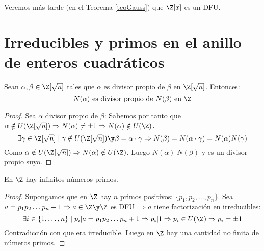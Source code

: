 Veremos más tarde $($en el Teorema \ref{teoGauss}$)$ que $\Z[x]$ es un DFU.

\newpage
\section{Irreducibles y primos en el anillo de enteros cuadráticos}

\begin{lema}
    Sean $\alpha, \beta \in \Z[\sqrt{n}]$ tales que $\alpha$ es divisor propio de $\beta$ en $\Z[\sqrt{n}]$. Entonces:
    $$N(\alpha) \mbox{ es divisor propio de } N(\beta) \mbox{ en } \Z$$
\begin{proof}
    Sea $\alpha$ divisor propio de $\beta$:\newline
    Sabemos por tanto que $\alpha \notin U(\Z[\sqrt{n}]) \Rightarrow N(\alpha) \neq \pm 1 \Rightarrow N(\alpha) \notin U(\Z)$.
    \newline
    $$\exists \gamma \in \Z[\sqrt{n}] \mid \gamma \notin U(\Z[\sqrt{n}]) \y \beta = \alpha \cdot \gamma \Rightarrow
        N(\beta) = N(\alpha \cdot \gamma) = N(\alpha)N(\gamma)$$
    Como $\alpha \notin U(\Z[\sqrt{n}]) \Rightarrow N(\alpha) \notin U(\Z)$.\newline
    Luego $N(\alpha)|N(\beta)$ y es un divisor propio suyo.
\end{proof}
\end{lema}


\begin{teo}
    En $\Z$ hay infinitos números primos.
\begin{proof}
    Supongamos que en $\Z$ hay $n$ primos positivos: $\{p_1, p_2, \ldots, p_n\}$.\newline
    Sea $a=p_1p_2\ldots p_n +1 \Rightarrow a \in \Z \y \Z$ es DFU $\Rightarrow a$ tiene factorización en irreducibles:
    $$\exists i \in \{1, \ldots, n\} \mid p_i|a=p_1p_2\ldots p_n+1 \Rightarrow p_i|1 \Rightarrow p_i \in U(\Z) \Rightarrow
        p_i = \pm 1$$
    \underline{Contradicción} con que era irreducible. Luego en $\Z$ hay una cantidad no finita de números primos.
\end{proof}
\end{teo}

